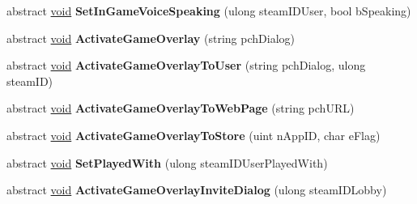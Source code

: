 \begin{DoxyCompactItemize}
\item 
\hypertarget{classValve_1_1Steamworks_1_1ISteamFriends_afe9cb07c47e8b8d1b2096d4ddb7ddd6d}{}abstract \hyperlink{SDL__audio_8h_a52835ae37c4bb905b903cbaf5d04b05f}{void} {\bfseries Set\+In\+Game\+Voice\+Speaking} (ulong steam\+I\+D\+User, bool b\+Speaking)\label{classValve_1_1Steamworks_1_1ISteamFriends_afe9cb07c47e8b8d1b2096d4ddb7ddd6d}

\item 
\hypertarget{classValve_1_1Steamworks_1_1ISteamFriends_acdb20afd762fa2851699af0b3d2dc96e}{}abstract \hyperlink{SDL__audio_8h_a52835ae37c4bb905b903cbaf5d04b05f}{void} {\bfseries Activate\+Game\+Overlay} (string pch\+Dialog)\label{classValve_1_1Steamworks_1_1ISteamFriends_acdb20afd762fa2851699af0b3d2dc96e}

\item 
\hypertarget{classValve_1_1Steamworks_1_1ISteamFriends_a9cdc153471227cb663f4fa3eadbf279a}{}abstract \hyperlink{SDL__audio_8h_a52835ae37c4bb905b903cbaf5d04b05f}{void} {\bfseries Activate\+Game\+Overlay\+To\+User} (string pch\+Dialog, ulong steam\+I\+D)\label{classValve_1_1Steamworks_1_1ISteamFriends_a9cdc153471227cb663f4fa3eadbf279a}

\item 
\hypertarget{classValve_1_1Steamworks_1_1ISteamFriends_a57e252fda327fe85a4c925dbf3662d2d}{}abstract \hyperlink{SDL__audio_8h_a52835ae37c4bb905b903cbaf5d04b05f}{void} {\bfseries Activate\+Game\+Overlay\+To\+Web\+Page} (string pch\+U\+R\+L)\label{classValve_1_1Steamworks_1_1ISteamFriends_a57e252fda327fe85a4c925dbf3662d2d}

\item 
\hypertarget{classValve_1_1Steamworks_1_1ISteamFriends_af04fe7d3fe5a5642f1188bff8ed082dc}{}abstract \hyperlink{SDL__audio_8h_a52835ae37c4bb905b903cbaf5d04b05f}{void} {\bfseries Activate\+Game\+Overlay\+To\+Store} (uint n\+App\+I\+D, char e\+Flag)\label{classValve_1_1Steamworks_1_1ISteamFriends_af04fe7d3fe5a5642f1188bff8ed082dc}

\item 
\hypertarget{classValve_1_1Steamworks_1_1ISteamFriends_a63002c134e99a7ed80c2acec09a6d044}{}abstract \hyperlink{SDL__audio_8h_a52835ae37c4bb905b903cbaf5d04b05f}{void} {\bfseries Set\+Played\+With} (ulong steam\+I\+D\+User\+Played\+With)\label{classValve_1_1Steamworks_1_1ISteamFriends_a63002c134e99a7ed80c2acec09a6d044}

\item 
\hypertarget{classValve_1_1Steamworks_1_1ISteamFriends_a4cfa95652c9443a7b0c054589a233bb4}{}abstract \hyperlink{SDL__audio_8h_a52835ae37c4bb905b903cbaf5d04b05f}{void} {\bfseries Activate\+Game\+Overlay\+Invite\+Dialog} (ulong steam\+I\+D\+Lobby)\label{classValve_1_1Steamworks_1_1ISteamFriends_a4cfa95652c9443a7b0c054589a233bb4}


\end{DoxyCompactItemize}
